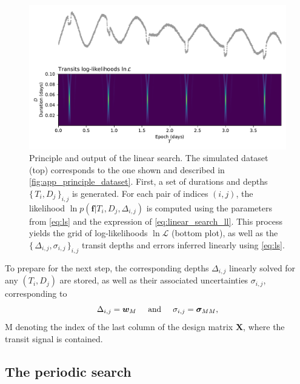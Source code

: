 \documentclass[modern]{aastex631}
\newcommand{\set}[1]{\{\,#1\,\}}
\begin{document}
\begin{figure}[H]
    \begin{centering}
        \includegraphics[width=\linewidth]{../workflows/principle/figures/principle_linear_search.pdf}
        \caption{Principle and output of the linear search. The simulated dataset (top) corresponds to the one shown and described in \autoref{fig:app_principle_dataset}. First, a set of durations and depths $\set{T_i, D_j}_{i,j}$ is generated. For each pair of indices $(i,j)$, the likelihood $\ln p(\bm{f} \vert T_i ,D_j, \Delta_{i,j})$ is computed using the parameters from \autoref{eq:ls} and the expression of \autoref{eq:linear_search_ll}. This process yields the grid of log-likelihoods $\ln\mathcal{L}$ (bottom plot), as well as the $\set{\Delta_{i,j}, \sigma_{i,j}}_{i, j}$ transit depths and errors inferred linearly using \autoref{eq:ls}.}
        \label{fig:linear_search}
    \end{centering}
\end{figure}

\noindent To prepare for the next step, the corresponding depths $\Delta_{i,j}$ linearly solved for any $(T_i ,D_j)$ are stored, as well as their associated uncertainties $\sigma_{i,j}$, corresponding to
\begin{equation*}
    \Delta_{i,j} = \bm{w}_M \hspace{0.5cm}\text{and}\hspace{0.5cm} \sigma_{i,j} = \bm{\sigma}_{MM},
\end{equation*}
M denoting the index of the last column of the design matrix $\bm{X}$, where the transit signal is contained.

\subsection{The periodic search}
\end{document}
